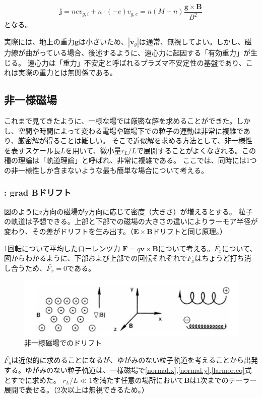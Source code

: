 \documentclass{ltjsarticle}
\numberwithin{equation}{section} %
\begin{document}
\begin{equation}
  \bm{j} = nev_{g,i} + n\cdot (-e)v_{g,e} = n(M+n)\frac{\bm{g}\times \bm{B}}{B^2}
\end{equation}
となる。

実際には、地上の重力$\bm{g}$は小さいため、$|\bm{v}_g|$は通常、無視してよい。しかし、磁力線が曲がっている場合、後述するように、遠心力に起因する「有効重力」が生じる。
遠心力は「重力」不安定と呼ばれるプラズマ不安定性の基盤であり、これは実際の重力とは無関係である。

\subsection{非一様磁場}
これまで見てきたように、一様な場では厳密な解を求めることができた。しかし、空間や時間によって変わる電場や磁場下での粒子の運動は非常に複雑であり、厳密解が得ることは難しい。
そこで近似解を求める方法として、非一様性を表すスケール長$L$を用いて、微小量$r_L/L$で展開することがよくなされる。この種の理論は「軌道理論」と呼ばれ、非常に複雑である。
ここでは、同時には1つの非一様性しか含まないような最も簡単な場合について考える。

\subsubsection{\nabla {} \perp {} : grad Bドリフト}
図のようにz方向の磁場がy方向に応じて密度（大きさ）が増えるとする。
粒子の軌道は予想できる。上部と下部での磁場の大きさの違いによりラーモア半径が変わり、その差がドリフトを生み出す。（$\bm{E}\times \bm{B}$ドリフトと同じ原理。）

1回転について平均したローレンツ力 $\bm{F} = q\bm{v} \times \bm{B}$について考える。$\bar{F_x}$について、図からわかるように、下部および上部での回転それぞれで$F_x$はちょうど打ち消し合うため、$\bar{F_x}=0$である。

\begin{figure}[htbp]
  \centering
  \includegraphics[width=0.7\linewidth]{gradB_drift.png}
  \caption{非一様磁場でのドリフト}
  \label{fig.gradB_drift}
\end{figure}

$\bar{F_y}$は近似的に求めることになるが、ゆがみのない粒子軌道を考えることから出発する。ゆがみのない粒子軌道は、一様磁場で\eqref{normal.x},\eqref{normal.y},\eqref{larmor.eq}式とすでに求めた。
$r_L/L\ll 1$を満たす任意の場所において$\bm{B}$は1次までのテーラー展開で表せる。（2次以上は無視できるため。）
\end{document}

